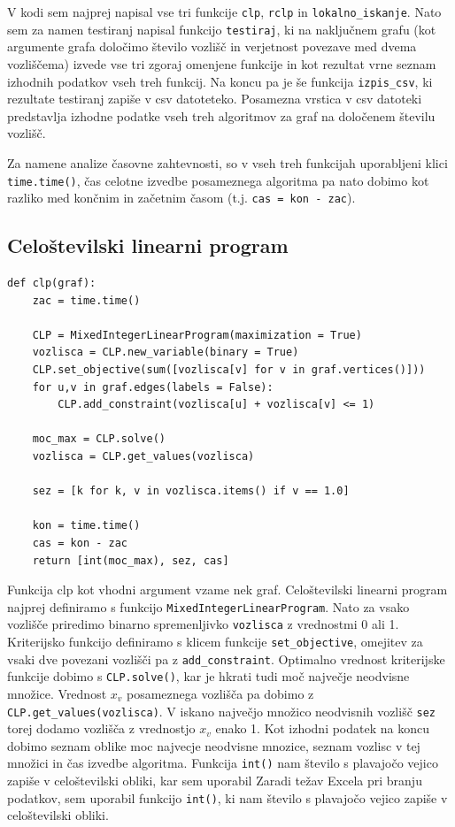 \documentclass[a4paper, 12 pt]{article}
\theoremstyle{definition}
\theoremstyle{plain}
\theoremstyle{remark}
\begin{document}
V kodi sem najprej napisal vse tri funkcije \verb|clp|, \verb|rclp| in \verb|lokalno_iskanje|. Nato sem za namen testiranj napisal funkcijo \verb|testiraj|, ki na naključnem grafu (kot argumente grafa določimo število vozlišč in verjetnost povezave med dvema vozliščema) izvede vse tri zgoraj omenjene funkcije in kot rezultat vrne seznam izhodnih podatkov vseh treh funkcij. Na koncu pa je še funkcija \verb|izpis_csv|, ki rezultate testiranj zapiše v csv datoteteko. Posamezna vrstica v csv datoteki predstavlja izhodne podatke vseh treh algoritmov za graf na določenem številu vozlišč.

Za namene analize časovne zahtevnosti, so v vseh treh funkcijah uporabljeni klici \verb|time.time()|, čas celotne izvedbe posameznega algoritma pa nato dobimo kot razliko med končnim in začetnim časom (t.j. \verb|cas = kon - zac|).

\subsection{Celoštevilski linearni program} \label{CLP}
\begin{verbatim}
def clp(graf):
    zac = time.time()

    CLP = MixedIntegerLinearProgram(maximization = True) 
    vozlisca = CLP.new_variable(binary = True) 
    CLP.set_objective(sum([vozlisca[v] for v in graf.vertices()])) 
    for u,v in graf.edges(labels = False):
        CLP.add_constraint(vozlisca[u] + vozlisca[v] <= 1) 

    moc_max = CLP.solve() 
    vozlisca = CLP.get_values(vozlisca) 

    sez = [k for k, v in vozlisca.items() if v == 1.0]

    kon = time.time() 
    cas = kon - zac
    return [int(moc_max), sez, cas]
\end{verbatim}

Funkcija clp kot vhodni argument vzame nek graf. Celoštevilski linearni program najprej definiramo s funkcijo \verb|MixedIntegerLinearProgram|. Nato za vsako vozlišče priredimo binarno spremenljivko \verb|vozlisca| z vrednostmi 0 ali 1. Kriterijsko funkcijo definiramo s klicem funkcije \verb|set_objective|, omejitev za vsaki dve povezani vozlišči pa z \verb|add_constraint|. Optimalno vrednost kriterijske funkcije dobimo s \verb|CLP.solve()|, kar je hkrati tudi moč največje neodvisne množice. Vrednost $x_v$ posameznega vozlišča pa dobimo z \verb|CLP.get_values(vozlisca)|. V iskano največjo množico neodvisnih vozlišč \verb|sez| torej dodamo vozlišča z vrednostjo $x_v$ enako 1. Kot izhodni podatek na koncu dobimo seznam oblike moc najvecje neodvisne mnozice, seznam vozlisc v tej množici in čas izvedbe algoritma. Funkcija \verb|int()| nam število s plavajočo vejico zapiše v celoštevilski obliki, kar sem uporabil Zaradi težav Excela pri branju podatkov, sem uporabil funkcijo \verb|int()|, ki nam število s plavajočo vejico zapiše v celoštevilski obliki. 
\end{document}
